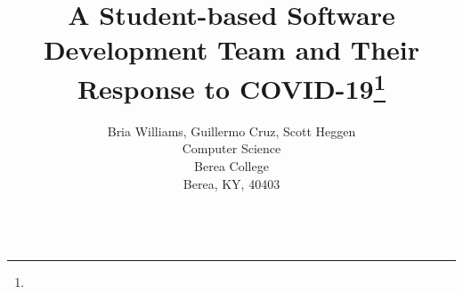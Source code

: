 \documentclass{article}
\title{A Student-based Software Development Team and Their Response to COVID-19\footnote{\protect}}
\author{
Bria Williams, Guillermo Cruz, Scott Heggen\\
Computer Science\\
Berea College\\
Berea, KY, 40403\\
\email{\{williamsbri,cruzg,heggens\}@berea.edu}\\
}
\begin{document}
\maketitle

\begin{abstract}
 
\end{abstract}


% 





\medskip



\end{document}
